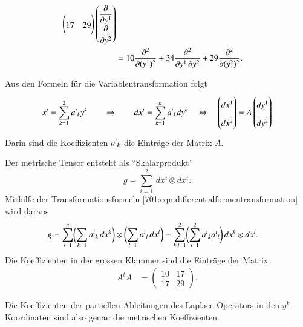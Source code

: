 \begin{loesung}
\begin{teilaufgaben}
\begin{align*}
\begin{pmatrix}
17&29
\end{pmatrix}
\bgroup
\renewcommand{\arraystretch}{1.8}
\begin{pmatrix}
\displaystyle \frac{\partial }{\partial y^1}\\
\displaystyle \frac{\partial }{\partial y^2}
\end{pmatrix}
\egroup
\\
&=
10\frac{\partial^2}{\partial (y^1)^2}
+
34\frac{\partial^2}{\partial y^1\,\partial y^2}
+
29\frac{\partial^2}{\partial (y^2)^2}.
\end{align*}
\item
Aus den Formeln für die Variablentransformation folgt
\begin{equation}
x^i = \sum_{k=1}^2 a^i\mathstrut_k y^k
\qquad\Rightarrow\qquad
dx^i
=
\sum_{k=1}^n a^i\mathstrut_k dy^k
\quad
\Leftrightarrow
\quad
\begin{pmatrix}dx^1\\dx^2\end{pmatrix}
=
A
\begin{pmatrix}dy^1\\dy^2\end{pmatrix}
\label{701:eqn:differentialformentransformation}
\end{equation}
Darin sind die Koeffizienten $a^i\mathstrut_k$ die Einträge der Matrix $A$.
\item
Der metrische Tensor entsteht als ``Skalarprodukt'' 
\[
g
=
\sum_{i=1}^2\, dx^i\otimes dx^i.
\]
Mithilfe der Transformationsformeln
\eqref{701:eqn:differentialformentransformation}
wird daraus
\begin{align*}
g
&=
\sum_{i=1}^n
\biggl(\sum_{k=1} a^i\mathstrut_k\,dx^k\biggr)
\otimes
\biggl(\sum_{l=1} a^i\mathstrut_l\,dx^l\biggr)
=
\sum_{k,l=1}^2
\biggl(
\sum_{i=1}^2
a^i\mathstrut_k
a^i\mathstrut_l
\biggr)
\,
dx^k\otimes dx^l.
\end{align*}
Die Koeffizienten in der grossen Klammer sind die Einträge der Matrix
\begin{align*}
A^tA
&=
\begin{pmatrix}
10&17\\
17&29
\end{pmatrix}.
\end{align*}
\item
Die Koeffizienten der partiellen Ableitungen des Laplace-Operators
in den $y^k$-Koor\-dinaten sind also genau die metrischen Koeffizienten.
\qedhere
\end{teilaufgaben}
\end{loesung}
